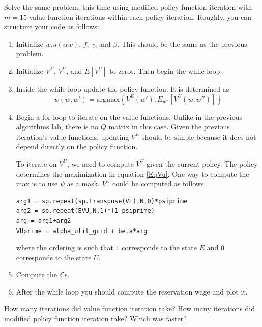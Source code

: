 \begin{problem}
Solve the same problem, this time using modified policy function iteration with $m=15$ value function iterations within each policy iteration.  Roughly, you can structure your code as follows:

\begin{enumerate}
	\item Initialize $w$,$u(\alpha w)$, $f$, $\gamma$, and $\beta$.  This should be the same as the previous problem.
	
	\item	Initialize $V^E$, $V^U$, and $E[V^U]$ to zeros.  Then begin the while loop.
	
	\item Inside the while loop update the policy function.  It is determined as
	\begin{equation}
		\psi (w,w') = \text{argmax} \left\{ V^E(w'), E_{w''}[V^U(w,w'')]\right\}
	\end{equation}
	
	\item Begin a for loop to iterate on the value functions.  Unlike in the previous algorithms lab, there is no $Q$ matrix in this case.  Given the previous iteration's value functions, updating $V^E$ should be simple because it does not depend directly on the policy function.
	
	To iterate on $V^U$, we need to compute $V^U$ given the current policy.  The policy determines the maximization in equation \eqref{EqVu}.  One way to compute the max is to use $\psi$ as a mask.  $V^U$ could be computed as follows:
	
\begin{lstlisting}
arg1 = sp.repeat(sp.transpose(VE),N,0)*psiprime
arg2 = sp.repeat(EVU,N,1)*(1-psiprime)
arg = arg1+arg2
VUprime = alpha_util_grid + beta*arg
\end{lstlisting}	
\newpage
	where the ordering is such that $1$ corresponds to the state $E$ and $0$ corresponds to the state $U$.
	
	\item Compute the $\delta$'s.
	
	\item After the while loop you should compute the reservation wage and plot it.
\end{enumerate}
\end{problem}

\begin{problem}
How many iterations did value function iteration take?
How many iterations did modified policy function iteration take?
Which was faster?
\end{problem} 
